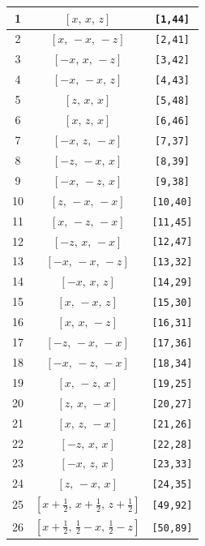 \documentclass[fleqn,8pt]{jsarticle}
\begin{document}
\begin{longtable}{ccc}
1 & $\left[ x,\, x,\, z \right]$ & {\tt [1,44]} \\ \hline
2 & $\left[ x,\, - x,\, - z \right]$ & {\tt [2,41]} \\ \hline
3 & $\left[ - x,\, x,\, - z \right]$ & {\tt [3,42]} \\ \hline
4 & $\left[ - x,\, - x,\, z \right]$ & {\tt [4,43]} \\ \hline
5 & $\left[ z,\, x,\, x \right]$ & {\tt [5,48]} \\ \hline
6 & $\left[ x,\, z,\, x \right]$ & {\tt [6,46]} \\ \hline
7 & $\left[ - x,\, z,\, - x \right]$ & {\tt [7,37]} \\ \hline
8 & $\left[ - z,\, - x,\, x \right]$ & {\tt [8,39]} \\ \hline
9 & $\left[ - x,\, - z,\, x \right]$ & {\tt [9,38]} \\ \hline
10 & $\left[ z,\, - x,\, - x \right]$ & {\tt [10,40]} \\ \hline
11 & $\left[ x,\, - z,\, - x \right]$ & {\tt [11,45]} \\ \hline
12 & $\left[ - z,\, x,\, - x \right]$ & {\tt [12,47]} \\ \hline
13 & $\left[ - x,\, - x,\, - z \right]$ & {\tt [13,32]} \\ \hline
14 & $\left[ - x,\, x,\, z \right]$ & {\tt [14,29]} \\ \hline
15 & $\left[ x,\, - x,\, z \right]$ & {\tt [15,30]} \\ \hline
16 & $\left[ x,\, x,\, - z \right]$ & {\tt [16,31]} \\ \hline
17 & $\left[ - z,\, - x,\, - x \right]$ & {\tt [17,36]} \\ \hline
18 & $\left[ - x,\, - z,\, - x \right]$ & {\tt [18,34]} \\ \hline
19 & $\left[ x,\, - z,\, x \right]$ & {\tt [19,25]} \\ \hline
20 & $\left[ z,\, x,\, - x \right]$ & {\tt [20,27]} \\ \hline
21 & $\left[ x,\, z,\, - x \right]$ & {\tt [21,26]} \\ \hline
22 & $\left[ - z,\, x,\, x \right]$ & {\tt [22,28]} \\ \hline
23 & $\left[ - x,\, z,\, x \right]$ & {\tt [23,33]} \\ \hline
24 & $\left[ z,\, - x,\, x \right]$ & {\tt [24,35]} \\ \hline
25 & $\left[ x + \frac{1}{2},\, x + \frac{1}{2},\, z + \frac{1}{2} \right]$ & {\tt [49,92]} \\ \hline
26 & $\left[ x + \frac{1}{2},\, \frac{1}{2} - x,\, \frac{1}{2} - z \right]$ & {\tt [50,89]} \\ \hline

\end{longtable}
\end{document}
